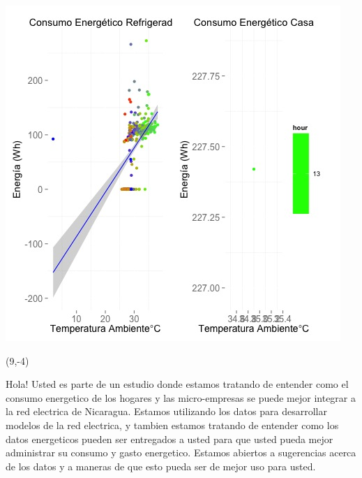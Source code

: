 \documentclass{article}\usepackage[]{graphicx}\usepackage[]{color}
\newenvironment{knitrout}{}{} %
\begin{document}
\begin{knitrout}
\color{fgcolor}
\includegraphics[scale=0.75]{figure/A18_correlaciones} 
\end{knitrout}

 \begin{textblock}{1}(9,-4)
\begin{minipage}{20em}
\begingroup

\endgroup
\end{minipage}
\end{textblock}


\vspace{70px}
\begin{knitrout}
Hola! Usted es parte de un estudio donde estamos tratando de entender como el consumo energetico de los hogares y las micro-empresas se puede mejor integrar a la red electrica de Nicaragua. Estamos utilizando los datos para desarrollar modelos de la red electrica, y tambien estamos tratando de entender como los datos energeticos pueden ser entregados a usted para que usted pueda mejor administrar su consumo y gasto energetico.  Estamos abiertos a sugerencias acerca de los datos y a maneras de que esto pueda ser de mejor uso para usted.
\end{knitrout}
\end{document}
